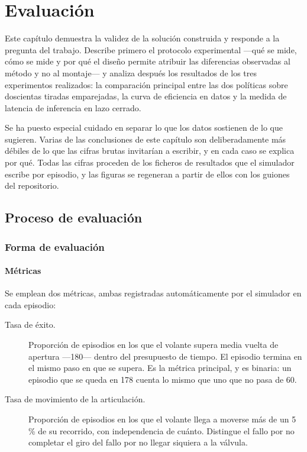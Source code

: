 \chapter{Evaluación}
\label{Evaluación}

Este capítulo demuestra la validez de la solución construida y responde a la pregunta del trabajo.
Describe primero el protocolo experimental —qué se mide, cómo se mide y por qué el diseño permite
atribuir las diferencias observadas al método y no al montaje— y analiza después los resultados de
los tres experimentos realizados: la comparación principal entre las dos políticas sobre
doscientas tiradas emparejadas, la curva de eficiencia en datos y la medida de latencia de
inferencia en lazo cerrado.

Se ha puesto especial cuidado en separar lo que los datos sostienen de lo que sugieren. Varias de
las conclusiones de este capítulo son deliberadamente más débiles de lo que las cifras brutas
invitarían a escribir, y en cada caso se explica por qué. Todas las cifras proceden de los ficheros
de resultados que el simulador escribe por episodio, y las figuras se regeneran a partir de ellos
con los guiones del repositorio.


\section{Proceso de evaluación}

\subsection{Forma de evaluación}

\subsubsection{Métricas}

Se emplean dos métricas, ambas registradas automáticamente por el simulador en cada episodio:

\begin{description}
	\item[Tasa de éxito.] Proporción de episodios en los que el volante supera media vuelta de
	apertura —180\textdegree— dentro del presupuesto de tiempo. El episodio termina en el mismo
	paso en que se supera. Es la métrica principal, y es binaria: un episodio que se queda en
	178\textdegree{} cuenta lo mismo que uno que no pasa de 60\textdegree.
	\item[Tasa de movimiento de la articulación.] Proporción de episodios en los que el volante
	llega a moverse más de un 5\,\% de su recorrido, con independencia de cuánto. Distingue el
	fallo por no completar el giro del fallo por no llegar siquiera a la válvula.
\end{description}

